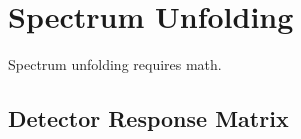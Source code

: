 \section{Spectrum Unfolding}\label{spectrum_unfolding}
Spectrum unfolding requires math.

\subsection{Detector Response Matrix}\label{subsec_drm}